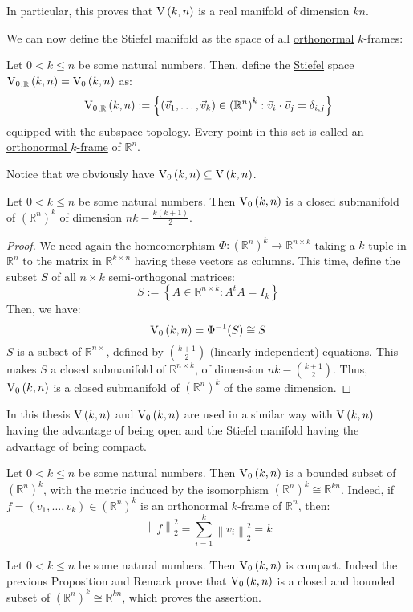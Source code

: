 \begin{remark} In particular, this proves that $\St{k}{n}$ is a real manifold of dimension $kn$.
\end{remark}

We can now define the Stiefel manifold as the space of all \ul{orthonormal} $k$-frames:
\begin{definition} Let $0<k\leq n$ be some natural numbers. Then, define the \ul{Stiefel} space $\StO{k}{n}{\mathbb{R}}=\StO{k}{n}$ as:
\[\StO{k}{n}{\mathbb{R}}:=\left\{\left(\vec{v}_1,\ldots,\vec{v}_k\right)\in{\left(\mathbb{R}^n\right)}^k:\vec{v}_i\cdot\vec{v}_j=\delta_{i,j}\right\}\]
equipped with the subspace topology. Every point in this set is called an \ul{orthonormal $k$-frame} of $\mathbb{R}^n$.
\end{definition}
Notice that we obviously have $\StO{k}{n}\subseteq\St{k}{n}$.

\begin{proposition}\label{prop:StO_dim_closed} Let $0<k\leq n$ be some natural numbers. Then $\StO{k}{n}$ is a closed submanifold of ${\left(\mathbb{R}^n\right)}^k$ of dimension $nk-\frac{k(k+1)}{2}$.
\end{proposition}

\begin{proof}
We need again the homeomorphism $\Phi:{\left(\mathbb{R}^n\right)}^k\to\mathbb{R}^{n\times k}$ taking a $k$-tuple in $\mathbb{R}^n$ to the matrix in $\mathbb{R}^{k\times n}$ having these vectors as columns. This time, define the subset $S$ of all $n\times k$ semi-orthogonal matrices:
\[S:=\left\{A\in\mathbb{R}^{n\times k}:A^t A=I_k\right\}\]
Then, we have:
\[\StO{k}{n}=\Phi^{-1}(S)\cong S\]
$S$ is a subset of $\mathbb{R}^{n\times}$, defined by $\binom{k+1}{2}$ (linearly independent) equations. This makes $S$ a closed submanifold of $\mathbb{R}^{n\times k}$, of dimension $nk-\binom{k+1}{2}$. Thus, $\StO{k}{n}$ is a closed submanifold of ${\left(\mathbb{R}^n\right)}^k$ of the same dimension.
\end{proof}

In this thesis $\St{k}{n}$ and $\StO{k}{n}$ are used in a similar way with $\St{k}{n}$ having the advantage of being open and the Stiefel manifold having the advantage of being compact.
\begin{remark} Let $0<k\leq n$ be some natural numbers. Then $\StO{k}{n}$ is a bounded subset of ${\left(\mathbb{R}^n\right)}^k$, with the metric induced by the isomorphism ${\left(\mathbb{R}^n\right)}^k\cong\mathbb{R}^{kn}$. Indeed, if $f=(v_1,\ldots,v_k)\in{\left(\mathbb{R}^n\right)}^k$ is an orthonormal $k$-frame of $\mathbb{R}^n$, then:
\[\left\|f\right\|_2^2=\sum_{i=1}^k\left\|v_i\right\|_2^2=k\]
\end{remark}

\begin{lemma}\label{lem:StO_compact} Let $0<k\leq n$ be some natural numbers. Then $\StO{k}{n}$ is compact. Indeed the previous Proposition and Remark prove that $\StO{k}{n}$ is a closed and bounded subset of ${\left(\mathbb{R}^n\right)}^k\cong\mathbb{R}^{kn}$, which proves the assertion.
\end{lemma}


